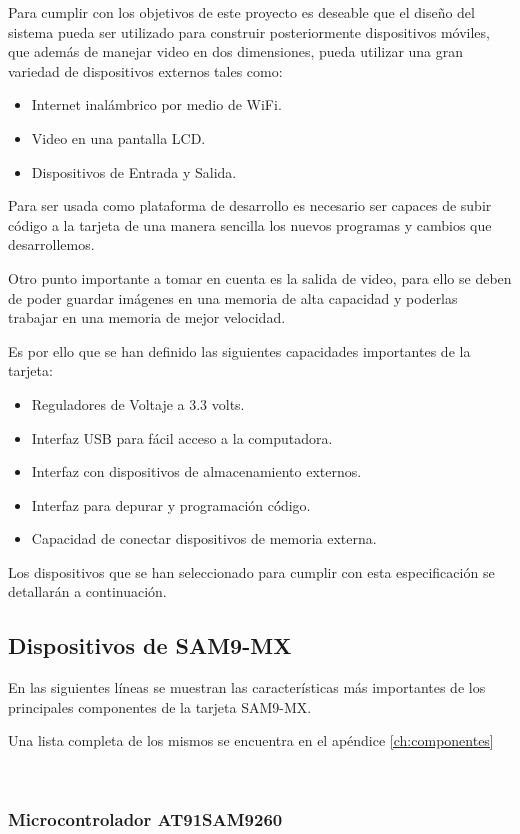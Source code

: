 Para cumplir con los objetivos de este proyecto es deseable que el
diseño del sistema pueda ser utilizado para construir posteriormente
dispositivos m\'{o}viles, que adem\'{a}s de manejar video en dos dimensiones,
pueda utilizar una gran variedad de dispositivos externos tales como: 
\begin{itemize}
\item Internet inal\'{a}mbrico por medio de WiFi.
\item Video en una pantalla LCD.
\item Dispositivos de Entrada y Salida.
\end{itemize}
Para ser usada como plataforma de desarrollo es necesario ser capaces
de subir c\'{o}digo a la tarjeta de una manera sencilla los nuevos
programas y cambios que desarrollemos. 

Otro punto importante a tomar en cuenta es la salida de video, para
ello se deben de poder guardar imágenes en una memoria de alta capacidad
y poderlas trabajar en una memoria de mejor velocidad. 

Es por ello que se han definido las siguientes capacidades importantes
de la tarjeta:
\begin{itemize}
\item Reguladores de Voltaje a 3.3 volts.
\item Interfaz USB para fácil acceso a la computadora.
\item Interfaz con dispositivos de almacenamiento externos.
\item Interfaz para depurar y programación c\'{ó}digo.
\item Capacidad de conectar dispositivos de memoria externa. 
\end{itemize}
Los dispositivos que se han seleccionado para cumplir con esta especificaci\'{o}n
se detallarán a continuación.\pagebreak{}

\subsection{Dispositivos de SAM9-MX}

En las siguientes líneas se muestran las características más importantes
de los principales componentes de la tarjeta \ac{SAM}9-MX.

Una lista completa de los mismos se encuentra en el apéndice \ref{ch:componentes}

\ 


\subsubsection*{Microcontrolador AT91SAM9260 }

